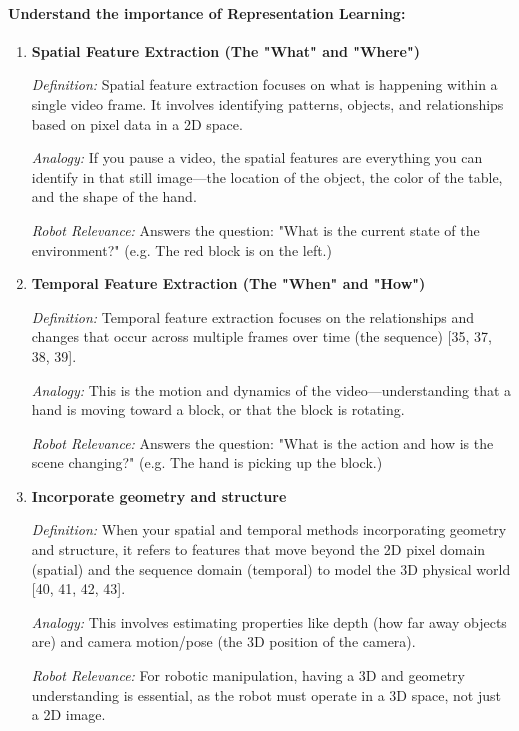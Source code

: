 
\paragraph{Understand the importance of Representation Learning:}
\begin{enumerate}
    \item \textbf{Spatial Feature Extraction (The "What" and "Where")}
    
    \textit{Definition:} Spatial feature extraction focuses on what is happening within a single video frame. It involves identifying patterns, objects, and relationships based on pixel data in a 2D space.

    \textit{Analogy:} If you pause a video, the spatial features are everything you can identify in that still image—the location of the object, the color of the table, and the shape of the hand.

    \textit{Robot Relevance:} Answers the question: "What is the current state of the environment?" (e.g. The red block is on the left.)

    \item \textbf{Temporal Feature Extraction (The "When" and "How")}
    
    \textit{Definition:} Temporal feature extraction focuses on the relationships and changes that occur across multiple frames over time (the sequence) [35, 37, 38, 39].
    
    \textit{Analogy:} This is the motion and dynamics of the video—understanding that a hand is moving toward a block, or that the block is rotating.
    
    \textit{Robot Relevance:} Answers the question: "What is the action and how is the scene changing?" (e.g. The hand is picking up the block.)

    \item \textbf{Incorporate geometry and structure}
    
    \textit{Definition:} When your spatial and temporal methods incorporating geometry and structure, it refers to features that move beyond the 2D pixel domain (spatial) and the sequence domain (temporal) to model the 3D physical world [40, 41, 42, 43].
    
    \textit{Analogy:} This involves estimating properties like depth (how far away objects are) and camera motion/pose (the 3D position of the camera).

    \textit{Robot Relevance:} For robotic manipulation, having a 3D and geometry understanding is essential, as the robot must operate in a 3D space, not just a 2D image.

\end{enumerate}


